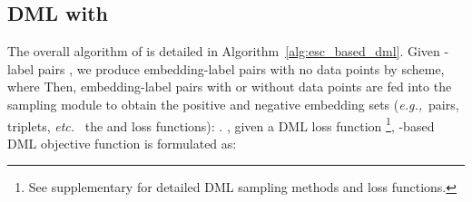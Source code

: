 \documentclass[runningheads]{llncs}
\def\eg{\emph{e.g.,}} \def\Eg{\emph{E.g.}}
\def\etc{\emph{etc.}} \def\vs{\emph{vs.}}
\begin{document}
\subsection{DML with \name}
The overall algorithm of  is detailed in Algorithm~\ref{alg:esc_based_dml}. Given -label pairs , we produce embedding-label pairs  with no data points by \shortname scheme, where 
Then, embedding-label pairs with or without data points are fed into the sampling module to obtain the positive and negative embedding sets (\eg~pairs, triplets, \etc~ the  and loss functions): . , given a DML loss function \footnote{
See supplementary for detailed DML sampling methods and loss functions.
}, \shortname-based DML objective function is formulated as:
\end{document}
